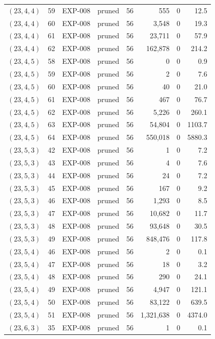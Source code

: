 \begin{longtable}{lrllrrrr}
$(23,4,4)$ & 59 & EXP-008 & pruned & 56 & 555 & 0 & 12.5 \\
$(23,4,4)$ & 60 & EXP-008 & pruned & 56 & 3{,}548 & 0 & 19.3 \\
$(23,4,4)$ & 61 & EXP-008 & pruned & 56 & 23{,}711 & 0 & 57.9 \\
$(23,4,4)$ & 62 & EXP-008 & pruned & 56 & 162{,}878 & 0 & 214.2 \\
$(23,4,5)$ & 58 & EXP-008 & pruned & 56 & 0 & 0 & 0.9 \\
$(23,4,5)$ & 59 & EXP-008 & pruned & 56 & 2 & 0 & 7.6 \\
$(23,4,5)$ & 60 & EXP-008 & pruned & 56 & 40 & 0 & 21.0 \\
$(23,4,5)$ & 61 & EXP-008 & pruned & 56 & 467 & 0 & 76.7 \\
$(23,4,5)$ & 62 & EXP-008 & pruned & 56 & 5{,}226 & 0 & 260.1 \\
$(23,4,5)$ & 63 & EXP-008 & pruned & 56 & 54{,}804 & 0 & 1103.7 \\
$(23,4,5)$ & 64 & EXP-008 & pruned & 56 & 550{,}018 & 0 & 5880.3 \\
$(23,5,3)$ & 42 & EXP-008 & pruned & 56 & 1 & 0 & 7.2 \\
$(23,5,3)$ & 43 & EXP-008 & pruned & 56 & 4 & 0 & 7.6 \\
$(23,5,3)$ & 44 & EXP-008 & pruned & 56 & 24 & 0 & 7.2 \\
$(23,5,3)$ & 45 & EXP-008 & pruned & 56 & 167 & 0 & 9.2 \\
$(23,5,3)$ & 46 & EXP-008 & pruned & 56 & 1{,}293 & 0 & 8.5 \\
$(23,5,3)$ & 47 & EXP-008 & pruned & 56 & 10{,}682 & 0 & 11.7 \\
$(23,5,3)$ & 48 & EXP-008 & pruned & 56 & 93{,}648 & 0 & 30.5 \\
$(23,5,3)$ & 49 & EXP-008 & pruned & 56 & 848{,}476 & 0 & 117.8 \\
$(23,5,4)$ & 46 & EXP-008 & pruned & 56 & 2 & 0 & 0.1 \\
$(23,5,4)$ & 47 & EXP-008 & pruned & 56 & 18 & 0 & 3.2 \\
$(23,5,4)$ & 48 & EXP-008 & pruned & 56 & 290 & 0 & 24.1 \\
$(23,5,4)$ & 49 & EXP-008 & pruned & 56 & 4{,}947 & 0 & 121.1 \\
$(23,5,4)$ & 50 & EXP-008 & pruned & 56 & 83{,}122 & 0 & 639.5 \\
$(23,5,4)$ & 51 & EXP-008 & pruned & 56 & 1{,}321{,}638 & 0 & 4374.0 \\
$(23,6,3)$ & 35 & EXP-008 & pruned & 56 & 1 & 0 & 0.1 \\

\end{longtable}
